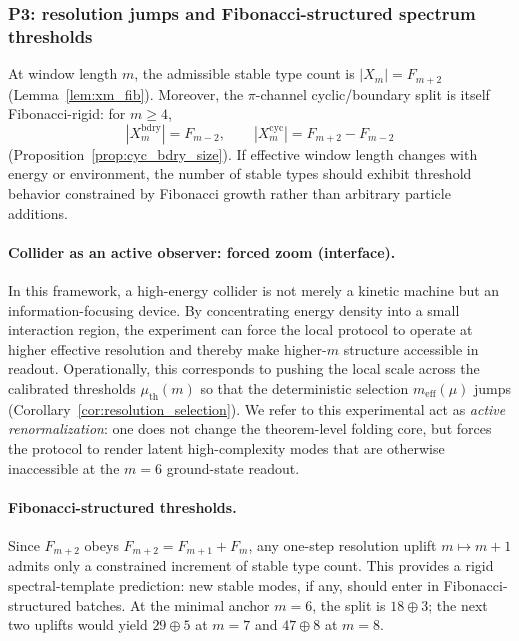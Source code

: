 \subsubsection{P3: resolution jumps and Fibonacci-structured spectrum thresholds}
\label{subsec:p3_resolution_jumps}

At window length $m$, the admissible stable type count is $|X_m|=F_{m+2}$ (Lemma~\ref{lem:xm_fib}).
Moreover, the $\pi$-channel cyclic/boundary split is itself Fibonacci-rigid:
for $m\ge 4$,
\[
|X_m^{\mathrm{bdry}}|=F_{m-2},\qquad |X_m^{\mathrm{cyc}}|=F_{m+2}-F_{m-2}
\]
(Proposition~\ref{prop:cyc_bdry_size}).
If effective window length changes with energy or environment, the number of stable types should exhibit threshold behavior constrained by Fibonacci growth rather than arbitrary particle additions.

\paragraph{Collider as an active observer: forced zoom (interface).}
In this framework, a high-energy collider is not merely a kinetic machine but an information-focusing device.
By concentrating energy density into a small interaction region, the experiment can force the local protocol to operate at higher effective resolution and thereby make higher-$m$ structure accessible in readout.
Operationally, this corresponds to pushing the local scale across the calibrated thresholds $\mu_{\mathrm{th}}(m)$ so that the deterministic selection $m_{\mathrm{eff}}(\mu)$ jumps (Corollary~\ref{cor:resolution_selection}).
We refer to this experimental act as \emph{active renormalization}: one does not change the theorem-level folding core, but forces the protocol to render latent high-complexity modes that are otherwise inaccessible at the $m=6$ ground-state readout.

\paragraph{Fibonacci-structured thresholds.}
Since $F_{m+2}$ obeys $F_{m+2}=F_{m+1}+F_m$, any one-step resolution uplift $m\mapsto m+1$ admits only a constrained increment of stable type count.
This provides a rigid spectral-template prediction: new stable modes, if any, should enter in Fibonacci-structured batches.
At the minimal anchor $m=6$, the split is $18\oplus 3$; the next two uplifts would yield $29\oplus 5$ at $m=7$ and $47\oplus 8$ at $m=8$.

